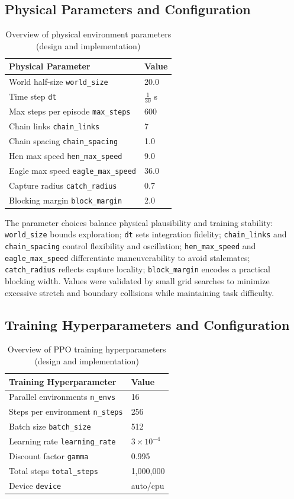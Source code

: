 \documentclass[12pt]{article}
\begin{document}
\subsection{Physical Parameters and Configuration}
\begin{table}[h]
\centering
{}
\begin{tabular}{ll}
\toprule
Physical Parameter & Value \\
\midrule
World half-size \texttt{world\_size} & 20.0 \\
Time step \texttt{dt} & $\frac{1}{30}$ s \\
Max steps per episode \texttt{max\_steps} & 600 \\
Chain links \texttt{chain\_links} & 7 \\
Chain spacing \texttt{chain\_spacing} & 1.0 \\
Hen max speed \texttt{hen\_max\_speed} & 9.0 \\
Eagle max speed \texttt{eagle\_max\_speed} & 36.0 \\
Capture radius \texttt{catch\_radius} & 0.7 \\
Blocking margin \texttt{block\_margin} & 2.0 \\
\bottomrule
\end{tabular}
\caption{Overview of physical environment parameters (design and implementation)}
\end{table}

The parameter choices balance physical plausibility and training stability: \texttt{world\_size} bounds exploration; \texttt{dt} sets integration fidelity; \texttt{chain\_links} and \texttt{chain\_spacing} control flexibility and oscillation; \texttt{hen\_max\_speed} and \texttt{eagle\_max\_speed} differentiate maneuverability to avoid stalemates; \texttt{catch\_radius} reflects capture locality; \texttt{block\_margin} encodes a practical blocking width. Values were validated by small grid searches to minimize excessive stretch and boundary collisions while maintaining task difficulty.

\subsection{Training Hyperparameters and Configuration}
\begin{table}[h]
\centering
\begin{tabular}{ll}
\toprule
Training Hyperparameter & Value \\
\midrule
Parallel environments \texttt{n\_envs} & 16 \\
Steps per environment \texttt{n\_steps} & 256 \\
Batch size \texttt{batch\_size} & 512 \\
Learning rate \texttt{learning\_rate} & $3\times10^{-4}$ \\
Discount factor \texttt{gamma} & 0.995 \\
Total steps \texttt{total\_steps} & 1,000,000 \\
Device \texttt{device} & auto/cpu \\
\bottomrule
\end{tabular}
\caption{Overview of PPO training hyperparameters (design and implementation)}
\end{table}
\end{document}

